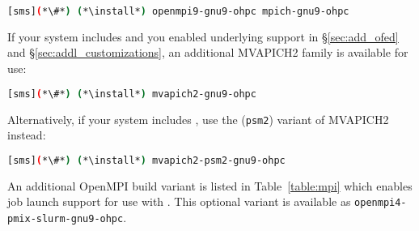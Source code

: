 \fi

\begin{lstlisting}[language=bash]
[sms](*\#*) (*\install*) openmpi9-gnu9-ohpc mpich-gnu9-ohpc
\end{lstlisting}

If your system includes \InfiniBand{} and you enabled underlying support in
\S\ref{sec:add_ofed} and \S\ref{sec:addl_customizations}, an additional
MVAPICH2 family is available for use:

\begin{lstlisting}[language=bash]
[sms](*\#*) (*\install*) mvapich2-gnu9-ohpc
\end{lstlisting}

Alternatively, if your system includes \IntelR{} \OmniPath{}, use the (\texttt{psm2})
variant of MVAPICH2 instead:

\begin{lstlisting}[language=bash]
[sms](*\#*) (*\install*) mvapich2-psm2-gnu9-ohpc
\end{lstlisting}

An additional OpenMPI build variant is listed in Table~\ref{table:mpi} which
enables \href{https://pmix.github.io/pmix/}{\color{blue}{PMIx}} job launch
support for use with \SLURM{}. This optional variant is
available as \texttt{openmpi4-pmix-slurm-gnu9-ohpc}.
